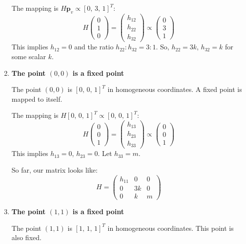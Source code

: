 \documentclass[12pt]{article}
\begin{document}
\begin{enumerate}
    The mapping is $H \mathbf{p}_v \propto [0,\,3,\,1]^T$:
    \[
    H \begin{pmatrix} 0 \\ 1 \\ 0 \end{pmatrix} = \begin{pmatrix} h_{12} \\ h_{22} \\ h_{32} \end{pmatrix} \propto \begin{pmatrix} 0 \\ 3 \\ 1 \end{pmatrix}
    \]
    This implies $h_{12} = 0$ and the ratio $h_{22} : h_{32} = 3 : 1$. So, $h_{22} = 3k$, $h_{32} = k$ for some scalar $k$.

    \item \textbf{The point $(0, 0)$ is a fixed point}

    The point $(0, 0)$ is $[0,\,0,\,1]^T$ in homogeneous coordinates. A fixed point is mapped to itself.

    The mapping is $H [0,\,0,\,1]^T \propto [0,\,0,\,1]^T$:
    \[
    H \begin{pmatrix} 0 \\ 0 \\ 1 \end{pmatrix} = \begin{pmatrix} h_{13} \\ h_{23} \\ h_{33} \end{pmatrix} \propto \begin{pmatrix} 0 \\ 0 \\ 1 \end{pmatrix}
    \]
    This implies $h_{13} = 0$, $h_{23} = 0$. Let $h_{33} = m$.

    So far, our matrix looks like:
    \[
    H = \begin{pmatrix}
        h_{11} & 0 & 0 \\
        0 & 3k & 0 \\
        0 & k & m
    \end{pmatrix}
    \]

    \item \textbf{The point $(1, 1)$ is a fixed point}

    The point $(1, 1)$ is $[1,\,1,\,1]^T$ in homogeneous coordinates. This point is also fixed.


\end{enumerate}
\end{document}
